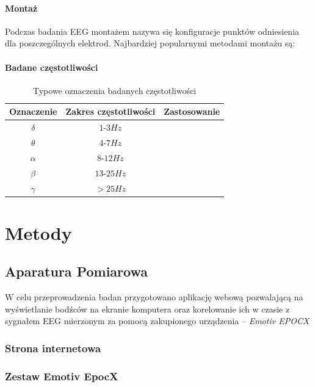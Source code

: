 \documentclass{./assets/wfis}
\begin{document}
\subsubsection{Montaż}
Podczas badania EEG montażem nazywa się konfiguracje punktów odniesienia dla poszczególnych elektrod. Najbardziej popularnymi metodami montażu są:


\subsubsection{Badane częstotliwości}

\begin{table}[h]
    \centering
    \begin{tabular}{|c|c|c|}
        \hline
        Oznaczenie & Zakres częstotliwości & Zastosowanie \\
        \hline
        $\delta$ & $1$-$3Hz$ & \\
        $\theta$ & $4$-$7Hz$ & \\
        $\alpha$ & $8$-$12Hz$ & \\
        $\beta$  & $13$-$25Hz$ & \\
        $\gamma$ & $>25Hz$ & \\
        \hline
    \end{tabular}
    \caption{Typowe oznaczenia badanych częstotliwości}
    \label{tab:freqs}
\end{table}

\chapter{Metody}


\section{Aparatura Pomiarowa}
 W celu przeprowadzenia badan przygotowano aplikację webową pozwalającą na wyświetlanie bodźców na ekranie komputera oraz korelowanie ich w czasie z sygnałem EEG mierzonym za pomocą zakupionego urządzenia – \textit{Emotiv EPOCX}

\subsection{Strona internetowa}
\subsection{Zestaw Emotiv EpocX}\label{emotiv}
\end{document}
